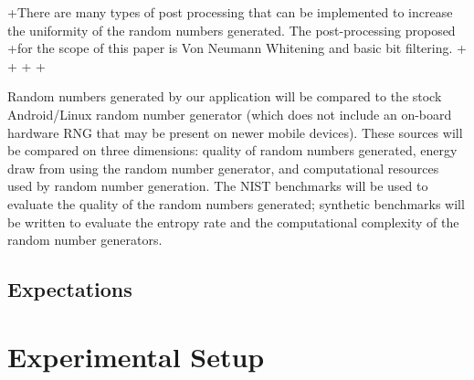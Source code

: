 \documentclass[conference]{IEEEtran}
\begin{document}

+There are many types of post processing that can be implemented to increase the uniformity of the random numbers generated. The post-processing proposed
+for the scope of this paper is Von Neumann Whitening \cite{vn_whitening} and basic bit filtering. 
+
+%
+%
+%
 
 Random numbers generated by our application will be compared to the stock Android/Linux random number generator (which does not include an on-board hardware
RNG that may be present on newer mobile devices).  These sources will be compared on three dimensions: quality of random numbers generated,
 energy draw from using the random number generator, and computational resources used by random number generation.  The NIST 
 \cite{nist} benchmarks will be used to evaluate the quality of the random numbers generated; synthetic benchmarks will be written to evaluate the
 entropy rate and the computational complexity of the random number generators.



\subsection{Expectations}


\section{Experimental Setup}

\end{document}

